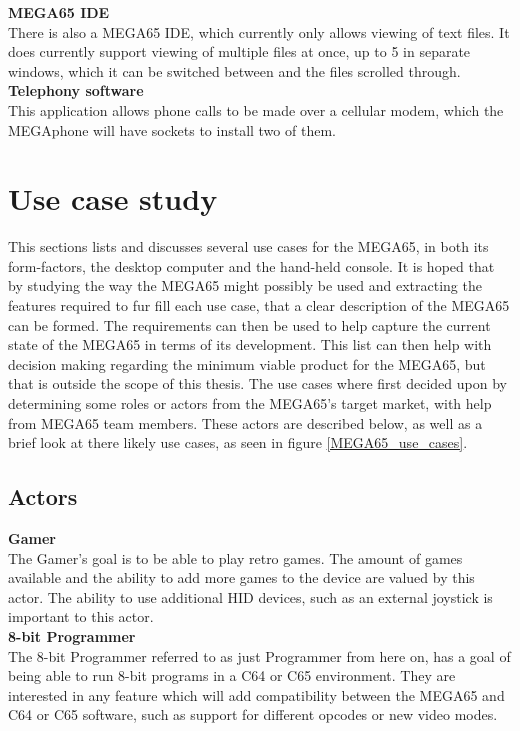 \textbf{MEGA65 IDE}\\
There is also a MEGA65 IDE, which currently only allows viewing of text files. It does currently support viewing of multiple files at once, up to 5 in separate windows, which it can be switched between and the files scrolled through.\\

\textbf{Telephony software}\\
This application allows phone calls to be made over a cellular modem, which the MEGAphone will have sockets to install two of them. \\


\section{Use case study}
This sections lists and discusses several use cases for the MEGA65, in both its form-factors, the desktop computer and the hand-held console. It is hoped that by studying the way the MEGA65 might possibly be used and extracting the features required to fur fill each use case, that a clear description of the MEGA65 can be formed. The requirements can then be used to help capture the current state of the MEGA65 in terms of its development. This list can then help with decision making regarding the minimum viable product for the MEGA65, but that is outside the scope of this thesis. The use cases where first decided upon by determining some roles or actors from the MEGA65's target market, with help from MEGA65 team members. These actors are described below, as well as a brief look at there likely use cases, as seen in figure \ref{MEGA65_use_cases}.

\subsection{Actors}
\textbf{Gamer}\\
The Gamer's goal is to be able to play retro games. The amount of games available and the ability to add more games to the device are valued by this actor. The ability to use additional HID devices, such as an external joystick is important to this actor.\\

\textbf{8-bit Programmer}\\
The 8-bit Programmer referred to as just Programmer from here on, has a goal of being able to run 8-bit programs in a C64 or C65 environment. They are interested in any feature which will add compatibility between the MEGA65 and C64 or C65 software, such as support for different opcodes or new video modes. \\

